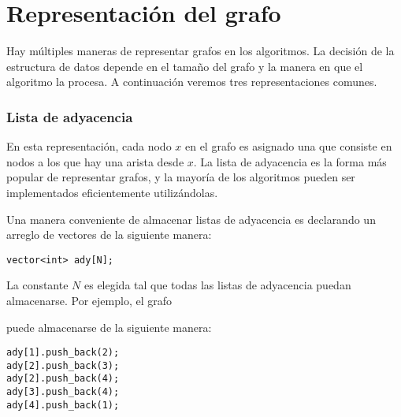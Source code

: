 \section{Representación del grafo}

Hay múltiples maneras de representar grafos
en los algoritmos. La decisión de la estructura
de datos depende en el tamaño del grafo y la manera
en que el algoritmo la procesa. A continuación veremos
tres representaciones comunes.

\subsubsection{Lista de adyacencia}


En esta representación,
cada nodo $x$ en el grafo es asignado una 
que consiste en nodos a los que hay una arista desde $x$.
La lista de adyacencia es la forma más popular de representar
grafos, y la mayoría de los algoritmos pueden ser implementados
eficientemente utilizándolas.

Una manera conveniente de almacenar listas de adyacencia es
declarando un arreglo de vectores de la siguiente manera:

\begin{lstlisting}
vector<int> ady[N];
\end{lstlisting}

La constante $N$ es elegida tal que todas las listas
de adyacencia puedan almacenarse. Por ejemplo, el grafo

\begin{center}
\end{center}

puede almacenarse de la siguiente manera:
\begin{lstlisting}
ady[1].push_back(2);
ady[2].push_back(3);
ady[2].push_back(4);
ady[3].push_back(4);
ady[4].push_back(1);
\end{lstlisting}

